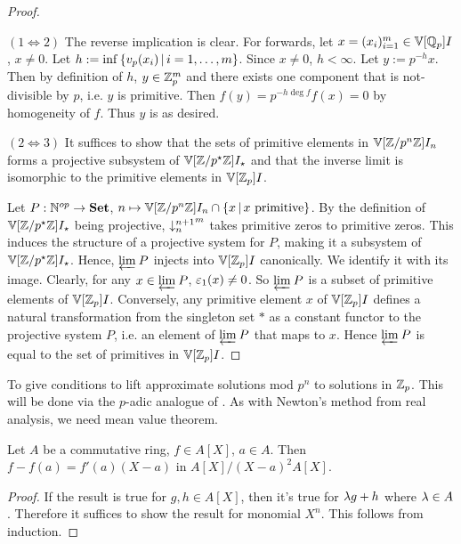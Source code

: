 \begin{proof}~
  
  $(1\iff 2)$ The reverse implication is clear. 
  For forwards, let $x = (x_i)_{i = 1}^m \in \mathbb{V}[\mathbb{Q}_p]{I}$, $x \neq 0$. 
  Let $h := \inf\left\{v_p(x_i) \,|\, i = 1, \dots, m\right\}$.
  Since $x \neq 0$, $h < \infty$.
  Let $y := p^{-h}x$. 
  Then by definition of $h$, $y \in \mathbb{Z}_p^m$ and there exists one component 
  that is not-divisible by $p$, i.e. $y$ is primitive. 
  Then $f(y) = p^{-h\deg f}f(x) = 0$ by homogeneity of $f$. 
  Thus $y$ is as desired.
  
  $(2 \iff 3)$ It suffices to show that 
  the sets of primitive elements in $\mathbb{V}[\mathbb{Z}/p^n\mathbb{Z}]{I_n}$ forms a 
  projective subsystem of $\mathbb{V}[\mathbb{Z}/p^\star\mathbb{Z}]{I_\star}$ and that 
  the inverse limit is isomorphic to the primitive elements in $\mathbb{V}[\mathbb{Z}_p]{I}$.
  
  Let $P : \mathbb{N}^{op} \to \mathbf{Set}$, 
  $n \mapsto \mathbb{V}[\mathbb{Z}/p^n\mathbb{Z}]{I_n} \cap \left\{x \,|\, x \text{ primitive}\right\}$. 
  By the definition of $\mathbb{V}[\mathbb{Z}/p^\star\mathbb{Z}]{I_\star}$ being projective, 
  ${\downarrow_{n}^{n+1}}^m$ takes primitive zeros to primitive zeros.
  This induces the structure of a projective system for $P$,
  making it a subsystem of $\mathbb{V}[\mathbb{Z}/p^\star\mathbb{Z}]{I_\star}$.
  Hence, $\varprojlim_{{}} P$ injects into $\mathbb{V}[\mathbb{Z}_p]{I}$ canonically. 
  We identify it with its image. 
  Clearly, for any $x \in \varprojlim_{{}} P$, $\varepsilon_1(x) \neq 0$. 
  So $\varprojlim_{{}} P$ is a subset of primitive elements of $\mathbb{V}[\mathbb{Z}_p]{I}$.
  Conversely, any primitive element $x$ of $\mathbb{V}[\mathbb{Z}_p]{I}$ defines 
  a natural transformation from the singleton set $*$ as a constant functor
  to the projective system $P$,
  i.e. an element of $\varprojlim_{{}} P$ that maps to $x$. 
  Hence $\varprojlim_{{}} P$ is equal to 
  the set of primitives in $\mathbb{V}[\mathbb{Z}_p]{I}$.
\end{proof}

\begin{rmk}
  
  To give conditions to lift approximate solutions mod $p^n$
  to solutions in $\mathbb{Z}_p$. 
  This will be done via the $p$-adic analogue of 
  .
  As with Newton's method from real analysis, 
  we need mean value theorem. 
\end{rmk}

\begin{prop}
  Let $A$ be a commutative ring, $f \in A[X]$, $a \in A$. 
  Then $f - f(a) = f'(a)(X - a)$ in $A[X]/(X-a)^2A[X]$. 
\end{prop}
\begin{proof}
  If the result is true for $g, h \in A[X]$,
  then it's true for $\lambda g + h$ where $\lambda \in A$. 
  Therefore it suffices to show the result for monomial $X^n$. 
  This follows from induction. 
\end{proof}

